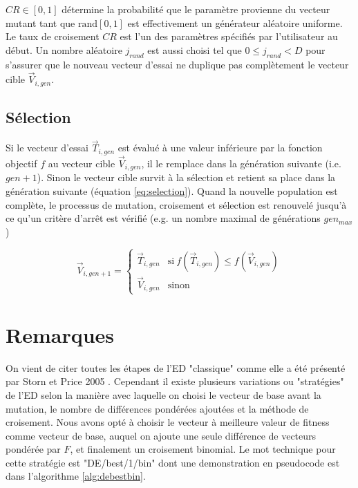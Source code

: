 $CR \in [0,1]$ détermine la probabilité que le paramètre provienne du vecteur mutant tant que $\text{rand}[0, 1]$ est effectivement un générateur aléatoire uniforme. Le taux de croisement $CR$ est l'un des paramètres spécifiés par l'utilisateur au début. Un nombre aléatoire $j_{rand}$ est aussi choisi tel que $0 \leq j_{rand} < D$ pour s'assurer que le nouveau vecteur d'essai ne duplique pas complètement le vecteur cible $\vec{V}_{i,gen}$.

\subsection{Sélection}
Si le vecteur d'essai $\vec{T}_{i,gen}$ est évalué à une valeur inférieure par la fonction objectif $f$ au vecteur cible $\vec{V}_{i,gen}$, il le remplace dans la génération suivante (i.e. $gen + 1$). Sinon le vecteur cible survit à la sélection et retient sa place dans la génération suivante (équation \ref{eq:selection}).
Quand la nouvelle population est complète, le processus de mutation, croisement et sélection est renouvelé jusqu'à ce qu'un critère d'arrêt est vérifié (e.g. un nombre maximal de générations $gen_{max}$)

\begin{equation}
  \label{eq:selection}
  \vec{V}_{i, gen + 1} =
  \begin{cases}
    \vec{T}_{i,gen} & \text{si}\ f(\vec{T}_{i,gen}) \leq f(\vec{V}_{i,gen})\\
    \vec{V}_{i,gen} & \text{sinon}
  \end{cases}
\end{equation}

\section{Remarques}
On vient de citer toutes les étapes de l'ED "classique" comme elle a été présenté par Storn et Price 2005 \cite{Price2005}. Cependant il existe plusieurs variations ou "stratégies" de l'ED selon la manière avec laquelle on choisi le vecteur de base avant la mutation, le nombre de différences pondérées ajoutées et la méthode de croisement. Nous avons opté à choisir le vecteur à meilleure valeur de fitness comme vecteur de base, auquel on ajoute une seule différence de vecteurs pondérée par $F$, et finalement un croisement binomial. Le mot technique pour cette stratégie est "DE/best/1/bin" dont une demonstration en pseudocode est dans l'algorithme \ref{alg:debestbin}.

